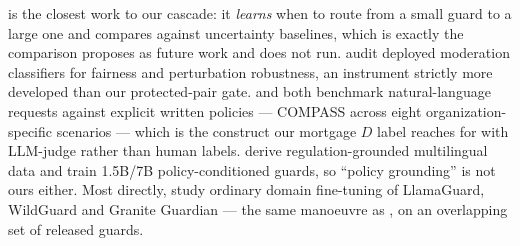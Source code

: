 \documentclass[11pt]{article}
\begin{document}
\citet{lee2025saferoute} is the closest work to our cascade: it \emph{learns} when to route from a small
guard to a large one and compares against uncertainty baselines, which is exactly the comparison
 proposes as future work and does not run. \citet{achara2025watchdogs} audit
deployed moderation classifiers for fairness and perturbation robustness, an instrument strictly more
developed than our protected-pair gate. \citet{cisnerosvelarde2026policy} and \citet{choi2026compass}
both benchmark natural-language requests against explicit written policies --- COMPASS across eight
organization-specific scenarios --- which is the construct our mortgage $D$ label reaches for with
LLM-judge rather than human labels. \citet{zhao2026mlbenchguard} derive regulation-grounded
multilingual data and train 1.5B/7B policy-conditioned guards, so ``policy grounding'' is not ours either. Most
directly, \citet{hossain2026safetygeometry} study ordinary domain fine-tuning of LlamaGuard, WildGuard
and Granite Guardian --- the same manoeuvre as , on an overlapping set of released
guards.
\end{document}
